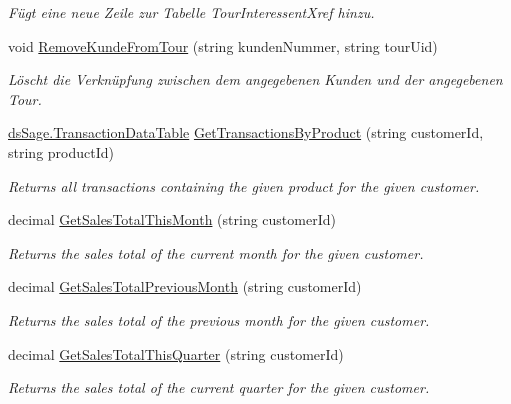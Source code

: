 \begin{DoxyCompactItemize}
\begin{DoxyCompactList}\small\item\em Fügt eine neue Zeile zur Tabelle Tour\+Interessent\+Xref hinzu. \end{DoxyCompactList}\item 
void \hyperlink{class_products_1_1_data_1_1_data_service_aa40243b506561541433624eaade00b0e}{Remove\+Kunde\+From\+Tour} (string kunden\+Nummer, string tour\+Uid)
\begin{DoxyCompactList}\small\item\em Löscht die Verknüpfung zwischen dem angegebenen Kunden und der angegebenen Tour. \end{DoxyCompactList}\item 
\hyperlink{class_products_1_1_data_1_1ds_sage_1_1_transaction_data_table}{ds\+Sage.\+Transaction\+Data\+Table} \hyperlink{class_products_1_1_data_1_1_data_service_ad4064a2f67999ce6cd59d4edfa9199e7}{Get\+Transactions\+By\+Product} (string customer\+Id, string product\+Id)
\begin{DoxyCompactList}\small\item\em Returns all transactions containing the given product for the given customer. \end{DoxyCompactList}\item 
decimal \hyperlink{class_products_1_1_data_1_1_data_service_a9ee577395d792c8ea3e8cd1618986d72}{Get\+Sales\+Total\+This\+Month} (string customer\+Id)
\begin{DoxyCompactList}\small\item\em Returns the sales total of the current month for the given customer. \end{DoxyCompactList}\item 
decimal \hyperlink{class_products_1_1_data_1_1_data_service_af3984f06ceba1df84ad363ab95396c67}{Get\+Sales\+Total\+Previous\+Month} (string customer\+Id)
\begin{DoxyCompactList}\small\item\em Returns the sales total of the previous month for the given customer. \end{DoxyCompactList}\item 
decimal \hyperlink{class_products_1_1_data_1_1_data_service_aa6d1476a26a6fe1f945a7565881d45cf}{Get\+Sales\+Total\+This\+Quarter} (string customer\+Id)
\begin{DoxyCompactList}\small\item\em Returns the sales total of the current quarter for the given customer. \end{DoxyCompactList}\item 

\end{DoxyCompactItemize}
